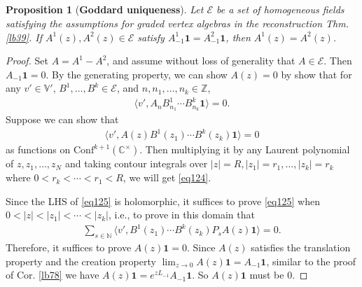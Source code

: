 \documentclass[12pt,a4paper,notitlepage]{article}
\theoremstyle{definition}
\theoremstyle{plain}
\newtheorem{pp}[df]{Proposition}
\newcommand{\mc}{\mathcal}
\newcommand{\id}{\mathbf{1}}
\newcommand{\Conf}{\mathrm{Conf}}
\newcommand{\bk}[1]{\langle {#1}\rangle}
\newcommand{\Vbb}{\mathbb V}
\newcommand{\Cbb}{\mathbb C}
\newcommand{\Nbb}{\mathbb N}
\newcommand{\Zbb}{\mathbb Z}
\numberwithin{equation}{section}
\begin{document}
\subsection{}
\begin{pp}[\textbf{Goddard uniqueness}]\label{lb162}
Let $\mc E$ be a set of homogeneous fields satisfying the assumptions for graded vertex algebras in the reconstruction Thm. \ref{lb39}. If $A^1(z),A^2(z)\in\mc E$ satisfy $A^1_{-1}\id=A^2_{-1}\id$, then $A^1(z)=A^2(z)$.
\end{pp}

\begin{proof}
Set $A=A^1-A^2$, and assume without loss of generality that $A\in\mc E$. Then $A_{-1}\id=0$. By the generating property, we can  show $A(z)=0$ by show that for any $v'\in\Vbb'$, $B^1,\dots,B^k\in\mc E$, and $n,n_1,\dots,n_k\in\Zbb$,
\begin{align}
\bk{v',A_nB^1_{n_1}\cdots B^k_{n_k}\id}=0.	\label{eq124}
\end{align} 
Suppose we can show that
\begin{align}
\bk{v',A(z)B^1(z_1)\cdots B^k(z_k)\id}=0	\label{eq125}
\end{align}
as functions on $\Conf^{k+1}(\Cbb^\times)$. Then multiplying it by any Laurent polynomial of $z,z_1,\dots,z_N$ and taking contour integrals over $|z|=R,|z_1|=r_1,\dots,|z_k|=r_k$ where $0<r_k<\cdots<r_1<R$, we will get \eqref{eq124}.

Since the LHS of \eqref{eq125} is holomorphic, it suffices to prove \eqref{eq125} when $0<|z|<|z_1|<\cdots<|z_k|$, i.e., to prove in this domain that
\begin{align*}
\sum_{s\in\Nbb}\bk{v',B^1(z_1)\cdots B^k(z_k)P_sA(z)\id}=0.	
\end{align*}
Therefore, it suffices to prove $A(z)\id=0$. Since $A(z)$ satisfies the translation property and the creation property $\lim_{z\rightarrow0}A(z)\id=A_{-1}\id$, similar to the proof of Cor. \ref{lb78} we have $A(z)\id=e^{zL_{-1}}A_{-1}\id$. So $A(z)\id$ must be $0$.
\end{proof}



\subsection{}
\end{document}
